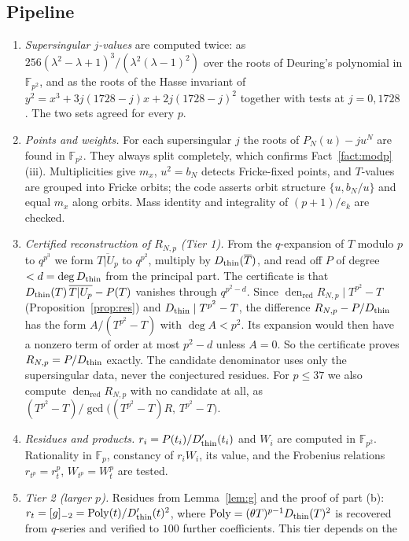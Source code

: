 \documentclass[11pt,a4paper]{article}
\numberwithin{equation}{section}
\theoremstyle{definition}
\theoremstyle{remark}
\newcommand{\Fp}{\mathbb F_p}
\newcommand{\Fq}{\mathbb F_{p^2}}
\newcommand{\den}{\operatorname{den}_{\mathrm{red}}}
\begin{document}
\subsection{Pipeline}
\begin{enumerate}[label=(\arabic*)]
\item \emph{Supersingular $j$-values} are computed twice: as $256(\lambda^2-\lambda+1)^3/(\lambda^2(\lambda-1)^2)$
over the roots of Deuring's polynomial in $\Fq$, and as the roots of the Hasse invariant of
$y^2=x^3+3j(1728-j)x+2j(1728-j)^2$ together with tests at $j=0,1728$. The two sets agreed for every $p$.
\item \emph{Points and weights.} For each supersingular $j$ the roots of $P_N(u)-ju^N$ are found in $\Fq$. They always split completely,
which confirms Fact~\ref{fact:modp}(iii). Multiplicities give $m_x$, $u^2=b_N$ detects Fricke-fixed points, and $T$-values are grouped into
Fricke orbits; the code asserts orbit structure $\{u,b_N/u\}$ and equal $m_x$ along orbits. Mass
identity and integrality of $(p+1)/e_k$ are checked.
\item \emph{Certified reconstruction of $R_{N,p}$ (Tier 1).} From the $q$-expansion of $T$ modulo $p$
to $q^{p^3}$ we form $\overline{T|U_p}$ to $q^{p^2}$, multiply by $D_{\rm thin}(\overline T)$, and read
off $P$ of degree $<d=\deg D_{\rm thin}$ from the principal part. The certificate is that
$D_{\rm thin}(T)\,\overline{T|U_p}-P(T)$ vanishes through $q^{p^2-d}$. Since $\den R_{N,p}\mid T^{p^2}-T$
(Proposition~\ref{prop:res}) and $D_{\rm thin}\mid T^{p^2}-T$, the difference $R_{N,p}-P/D_{\rm thin}$ has
the form $A/(T^{p^2}-T)$ with $\deg A<p^2$. Its expansion would then have a nonzero term of order at most $p^2-d$
unless $A=0$. So the certificate proves $R_{N,p}=P/D_{\rm thin}$ exactly. The candidate denominator
uses only the supersingular data, never the conjectured residues. For $p\le37$ we also compute
$\den R_{N,p}$ with no candidate at all, as $(T^{p^2}-T)/\gcd\bigl((T^{p^2}-T)R,\,T^{p^2}-T\bigr)$.
\item \emph{Residues and products.} $r_i=P(t_i)/D_{\rm thin}'(t_i)$ and $W_i$ are computed in $\Fq$.
Rationality in $\Fp$, constancy of $r_iW_i$, its value, and the Frobenius relations
$r_{t^p}=r_t^p$, $W_{t^p}=W_t^p$ are tested.
\item \emph{Tier 2 (larger $p$).} Residues from Lemma~\ref{lem:g} and the proof of part (b):
$r_t=[g]_{-2}=\mathrm{Poly}(t)/D_{\rm thin}'(t)^2$, where $\mathrm{Poly}=(\theta T)^{p-1}D_{\rm thin}(T)^2$ is
recovered from $q$-series and verified to $100$ further coefficients. This tier depends on the

\end{enumerate}
\end{document}
